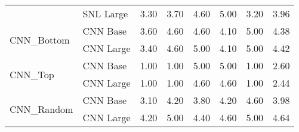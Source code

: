\begin{tabular}{llrrrrrr}
 & SNL Large & 3.30 & 3.70 & 4.60 & 5.00 & 3.20 & 3.96 \\
\cline{1-8}
\multirow[t]{2}{*}{CNN_Bottom} & CNN Base & 3.60 & 4.60 & 4.60 & 4.10 & 5.00 & 4.38 \\
 & CNN Large & 3.40 & 4.60 & 5.00 & 4.10 & 5.00 & 4.42 \\
\cline{1-8}
\multirow[t]{2}{*}{CNN_Top} & CNN Base & 1.00 & 1.00 & 5.00 & 5.00 & 1.00 & 2.60 \\
 & CNN Large & 1.00 & 1.00 & 4.60 & 4.60 & 1.00 & 2.44 \\
\cline{1-8}
\multirow[t]{2}{*}{CNN_Random} & CNN Base & 3.10 & 4.20 & 3.80 & 4.20 & 4.60 & 3.98 \\
 & CNN Large & 4.20 & 5.00 & 4.40 & 4.60 & 5.00 & 4.64 \\
\cline{1-8}
\bottomrule
\end{tabular}
